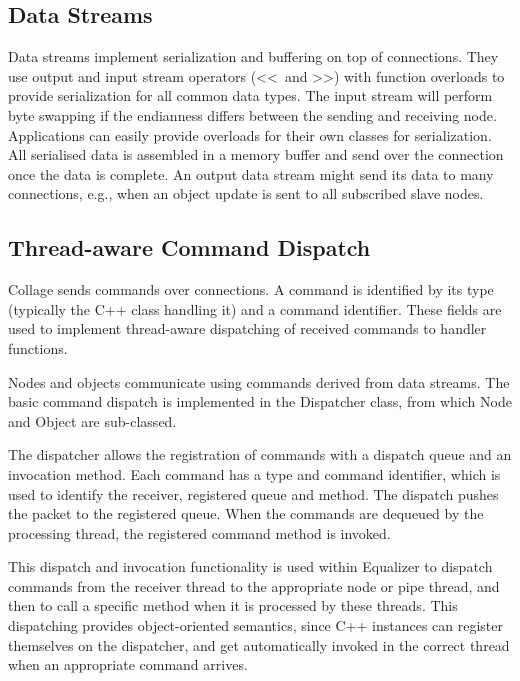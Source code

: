 \subsection{Data Streams}

Data streams implement serialization and buffering on top of connections. They
use output and input stream operators (\textless\textless\ and
\textgreater\textgreater) with function overloads to provide serialization for
all common data types. The input stream will perform byte swapping if the
endianness differs between the sending and receiving node. Applications can
easily provide overloads for their own classes for serialization. All
serialised data is assembled in a memory buffer and send over the connection
once the data is complete. An output data stream might send its data to many
connections, e.g., when an object update is sent to all subscribed slave nodes.

\subsection{Thread-aware Command Dispatch}

Collage sends commands over connections. A command is identified by its type
(typically the C++ class handling it) and a command identifier. These fields
are used to implement thread-aware dispatching of received commands to handler
functions.

Nodes and objects communicate using commands derived from data streams. The
basic command dispatch is implemented in the \textsf{Dispatcher} class, from
which \textsf{Node} and \textsf{Object} are sub-classed.

The dispatcher allows the registration of commands with a dispatch queue and an
invocation method. Each command has a type and command identifier, which is
used to identify the receiver, registered queue and method. The dispatch pushes
the packet to the registered queue. When the commands are dequeued by the
processing thread, the registered command method is invoked.

This dispatch and invocation functionality is used within Equalizer to dispatch
commands from the receiver thread to the appropriate node or pipe thread, and
then to call a specific method when it is processed by these threads. This
dispatching provides object-oriented semantics, since C++ instances can
register themselves on the dispatcher, and get automatically invoked in the
correct thread when an appropriate command arrives.

